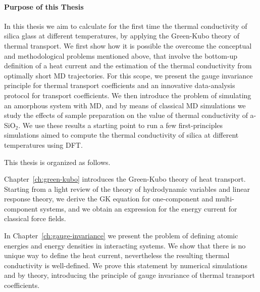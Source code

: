 \medskip

\paragraph{Purpose of this Thesis}
In this thesis we aim to calculate for the first time the thermal conductivity of silica glass at different temperatures, by applying the \abinitio Green-Kubo theory of thermal transport. 
We first show how it is possible the overcome the conceptual and methodological problems mentioned above, that involve the bottom-up definition of a heat current and the estimation of the thermal conductivity from optimally short MD trajectories. 
For this scope, we present the gauge invariance principle for thermal transport coefficients and an innovative data-analysis protocol for transport coefficients. 
We then introduce the problem of simulating an amorphous system with MD, and by means of classical MD simulations we study the effects of sample preparation on the value of thermal conductivity of a-SiO$_2$. 
We use these results a starting point to run a few first-principles simulations aimed to compute the thermal conductivity of silica at different temperatures using DFT. 


\medskip
This thesis is organized as follows. 

Chapter~\ref{ch:green-kubo} introduces the Green-Kubo theory of heat transport. 
Starting from a light review of the theory of hydrodynamic variables and linear response theory, we derive the GK equation for one-component and multi-component systems, and we obtain an expression for the energy current for classical force fields. 

In Chapter~\ref{ch:gauge-invariance} we present the problem of defining atomic energies and energy densities in interacting systems. We show that there is no unique way to define the heat current, nevertheless the resulting thermal conductivity is well-defined. We prove this statement by numerical simulations and by theory, introducing the principle of gauge invariance of thermal transport coefficients. 

